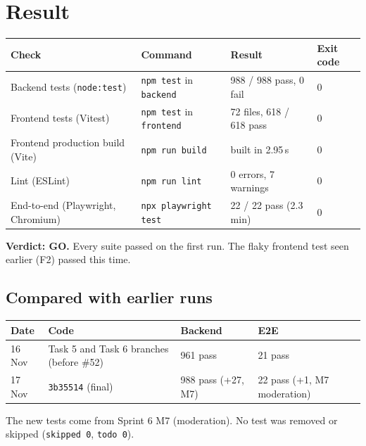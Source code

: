 \documentclass[11pt,a4paper]{article}
\begin{document}
\section{Result}
\begin{center}
\begin{tabularx}{\linewidth}{X l l l}\toprule
\textbf{Check} & \textbf{Command} & \textbf{Result} & \textbf{Exit code}\\\midrule
Backend tests (\texttt{node:test}) & \texttt{npm test} in \texttt{backend} & 988 / 988 pass, 0 fail & 0\\
Frontend tests (Vitest) & \texttt{npm test} in \texttt{frontend} & 72 files, 618 / 618 pass & 0\\
Frontend production build (Vite) & \texttt{npm run build} & built in 2.95\,s & 0\\
Lint (ESLint) & \texttt{npm run lint} & 0 errors, 7 warnings & 0\\
End-to-end (Playwright, Chromium) & \texttt{npx playwright test} & 22 / 22 pass (2.3\,min) & 0\\
\bottomrule\end{tabularx}\end{center}
\textbf{Verdict: GO.} Every suite passed on the first run. The flaky frontend test seen earlier (F2) passed this time.

\subsection{Compared with earlier runs}
\begin{center}
\begin{tabular}{l l l l}\toprule
\textbf{Date} & \textbf{Code} & \textbf{Backend} & \textbf{E2E}\\\midrule
16 Nov & Task 5 and Task 6 branches (before \#52) & 961 pass & 21 pass \\
17 Nov & \texttt{3b35514} (final) & 988 pass (+27, M7) & 22 pass (+1, M7 moderation) \\
\bottomrule\end{tabular}\end{center}
The new tests come from Sprint 6 M7 (moderation). No test was removed or skipped (\texttt{skipped 0}, \texttt{todo 0}).
\end{document}
